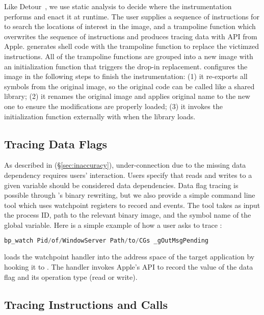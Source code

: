 Like Detour~\cite{hunt1999detours}, we use static analysis to decide where the
instrumentation performs and enact it at runtime. The user supplies a sequence
of instructions for \xxx to search the locations of interest in the image, and a
trampoline function which overwrites the sequence of instructions and produces
tracing data with API  from Apple. \xxx generates shell code
with the trampoline function to replace the victimzed instructions. All of
the trampoline functions are grouped into a new image with an initialization
function that triggers the drop-in replacement. \xxx configures the image in the
following steps to finish the instrumentation: (1) it re-exports all symbols
from the original image, so the original code can be called like a shared
library; (2) it renames the original image and applies original name to the
new one to ensure the modifications are properly loaded; (3) it invokes the
initialization function externally with  when the library
loads.

\subsection{Tracing Data Flags} \label{subsec:tcp}

As described in (\S\ref{sec:inaccuracy}), under-connection due to the missing
data dependency requires users' interaction. Users specify that reads and writes
to a given variable should be considered data dependencies. Data flag tracing
is possible through \xxx's binary rewriting, but we also provide a simple
command line tool which uses watchpoint registers to record \dataflagwrite and
\dataflagread events. The tool  takes as input the process ID,
path to the relevant binary image, and the symbol name of the global variable.
Here is a simple example of how a user asks \xxx to trace :

\begin{lstlisting}[language=c++,numbers=none]
bp_watch Pid/of/WindowServer Path/to/CGs _gOutMsgPending
\end{lstlisting}

\noindent \xxx loads the watchpoint handler into the address space of the target
application by hooking it to . The handler invokes Apple's
API  to record the value of the data flag and its operation
type (read or write).

\subsection{Tracing Instructions and Calls}

